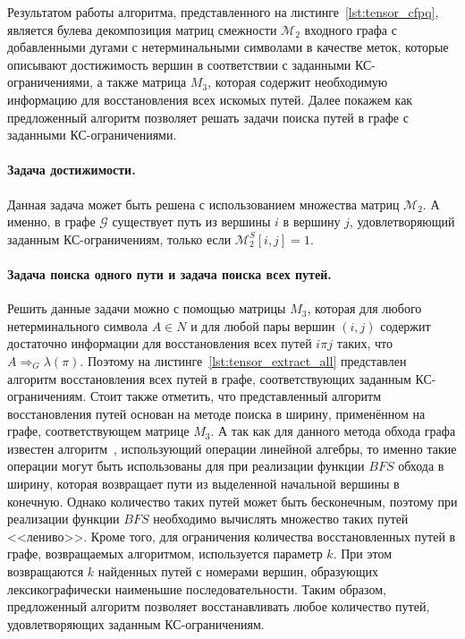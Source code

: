 Результатом работы алгоритма, представленного на листинге~\ref{lst:tensor_cfpq}, является булева декомпозиция матриц смежности $\mathcal{M}_2$ входного графа с добавленными дугами с нетерминальными символами в качестве меток, которые описывают достижимость вершин в соответствии с заданными КС-ограничениями, а также матрица $M_3$, которая содержит необходимую информацию для восстановления всех искомых путей. Далее покажем как предложенный алгоритм позволяет решать задачи поиска путей в графе с заданными КС-ограничениями.

\paragraph{Задача достижимости.} Данная задача может быть решена с использованием множества матриц $\mathcal{M}_2$. А именно, в графе $\mathcal{G}$ существует путь из вершины $i$ в вершину $j$, удовлетворяющий заданным КС-ограничениям, только если $\mathcal{M}_2^S[i, j] = 1$.

\paragraph{Задача поиска одного пути и задача поиска всех путей.} Решить данные задачи можно с помощью матрицы $M_3$, которая для любого нетерминального символа $A \in N$ и для любой пары вершин $(i, j)$ содержит достаточно информации для восстановления всех путей $i \pi j$ таких, что $A \Rightarrow_G \lambda(\pi)$. Поэтому на листинге~\cref{lst:tensor_extract_all} представлен алгоритм восстановления всех путей в графе, соответствующих заданным КС-ограничениям. Стоит также отметить, что  представленный алгоритм восстановления путей основан на методе поиска в ширину, применённом на графе, соответствующем матрице $M_3$. А так как для данного метода обхода графа известен алгоритм~\cite{kepner2011graph}, использующий операции линейной алгебры, то именно такие операции могут быть использованы для при реализации функции $BFS$ обхода в ширину, которая возвращает пути из выделенной начальной вершины в конечную. Однако количество таких путей может быть бесконечным, поэтому при реализации функции $BFS$ необходимо вычислять множество таких путей <<лениво>>. Кроме того, для ограничения количества восстановленных путей в графе, возвращаемых алгоритмом, используется параметр $k$. При этом возвращаются $k$ найденных путей с номерами вершин, образующих лексикографически наименьшие последовательности. Таким образом, предложенный алгоритм позволяет восстанавливать любое количество путей, удовлетворяющих заданным КС-ограничениям.


